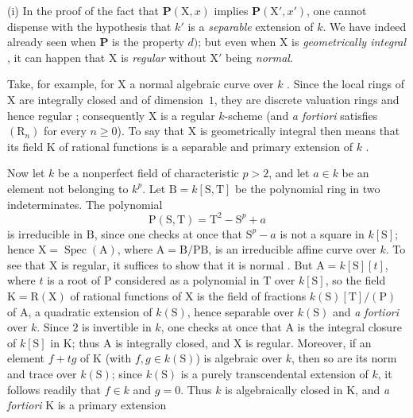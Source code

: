 \begin{remarks}[6.7.5]
\label{IV.6.7.5}
(i) In the proof of the fact that $\boldsymbol{P}(\mathrm{X}, x)$ implies $\boldsymbol{P}(\mathrm{X}', x')$, one cannot dispense with the hypothesis that $k'$ is a \emph{separable} extension of $k$. We have indeed already seen  when $\boldsymbol{P}$ is the property $d)$; but even when $\mathrm{X}$ is \emph{geometrically integral} , it can happen that $\mathrm{X}$ is \emph{regular} without $\mathrm{X}'$ being \emph{normal}.

Take, for example, for $\mathrm{X}$ a normal algebraic curve over $k$ . Since the local rings of $\mathrm{X}$ are integrally closed and of dimension~$1$, they are discrete valuation rings and hence regular ; consequently $\mathrm{X}$ is a regular $k$-scheme (and \emph{a fortiori} satisfies $(\mathrm{R}_n)$ for every $n\geqslant0$). To say that $\mathrm{X}$ is geometrically integral then means that its field $\mathrm{K}$ of rational functions is a separable and primary extension of $k$ .

Now let $k$ be a nonperfect field of characteristic $p>2$, and let $a\in k$ be an element not belonging to $k^p$. Let $\mathrm{B}=k[\mathrm{S},\mathrm{T}]$ be the polynomial ring in two indeterminates. The polynomial
\[
 \mathrm{P}(\mathrm{S},\mathrm{T})=\mathrm{T}^2-\mathrm{S}^p+a
\]
is irreducible in $\mathrm{B}$, since one checks at once that $\mathrm{S}^p-a$ is not a square in $k[\mathrm{S}]$; hence $\mathrm{X}=\operatorname{Spec}(\mathrm{A})$, where $\mathrm{A}=\mathrm{B}/\mathrm{PB}$, is an irreducible affine curve over $k$. To see that $\mathrm{X}$ is regular, it suffices to show that it is normal . But $\mathrm{A}=k[\mathrm{S}][t]$, where $t$ is a root of $\mathrm{P}$ considered as a polynomial in $\mathrm{T}$ over $k[\mathrm{S}]$, so the field $\mathrm{K}=\mathrm{R}(\mathrm{X})$ of rational functions of $\mathrm{X}$ is the field of fractions $k(\mathrm{S})[\mathrm{T}]/(\mathrm{P})$ of $\mathrm{A}$, a quadratic extension of $k(\mathrm{S})$, hence separable over $k(\mathrm{S})$ and \emph{a fortiori} over $k$. Since $2$ is invertible in $k$, one checks at once that $\mathrm{A}$ is the integral closure of $k[\mathrm{S}]$ in $\mathrm{K}$; thus $\mathrm{A}$ is integrally closed, and $\mathrm{X}$ is regular. Moreover, if an element $f+tg$ of $\mathrm{K}$ (with $f,g\in k(\mathrm{S})$) is algebraic over $k$, then so are its norm and trace over $k(\mathrm{S})$; since $k(\mathrm{S})$ is a purely transcendental extension of $k$, it follows readily that $f\in k$ and $g=0$. Thus $k$ is algebraically closed in $\mathrm{K}$, and \emph{a fortiori} $\mathrm{K}$ is a primary extension


\end{remarks}
